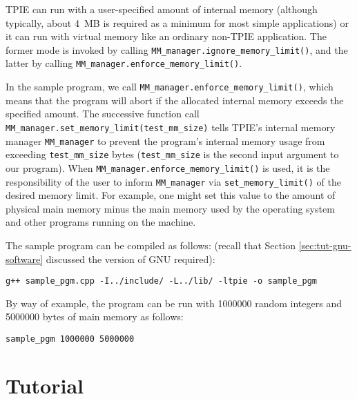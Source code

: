 TPIE can run with a user-specified amount of internal memory (although
typically, about 4~MB is required as a minimum for most simple
applications) or it can run with virtual memory like an ordinary
non-TPIE application. The former mode is invoked by calling
\lstinline|MM_manager.ignore_memory_limit()|, and the latter by
calling \lstinline|MM_manager.enforce_memory_limit()|.

In the sample program, we call
\lstinline|MM_manager.enforce_memory_limit()|, which means that the
program will abort if the allocated internal memory exceeds the
specified amount. The successive function call
\lstinline|MM_manager.set_memory_limit(test_mm_size)| tells TPIE's
internal memory manager \lstinline|MM_manager| to prevent the
program's internal memory usage from exceeding
\lstinline|test_mm_size| bytes (\lstinline|test_mm_size| is the second
input argument to our program). When
\lstinline|MM_manager.enforce_memory_limit()| is used, it is the
responsibility of the user to inform \lstinline|MM_manager| via
\lstinline|set_memory_limit()| of the desired memory limit.  For
example, one might set this value to the amount of physical main
memory minus the main memory used by the operating system and other
programs running on the machine.


The sample program can be compiled as follows: (recall that Section
\ref{sec:tut-gnu-software} discussed the version of GNU \CPP{}
required):

\begin{lstlisting}
g++ sample_pgm.cpp -I../include/ -L../lib/ -ltpie -o sample_pgm
\end{lstlisting}

By way of example, the program can be run with 1000000 random integers
and 5000000 bytes of main memory as follows:
\begin{lstlisting}
sample_pgm 1000000 5000000
\end{lstlisting}


\chapter{Tutorial}

